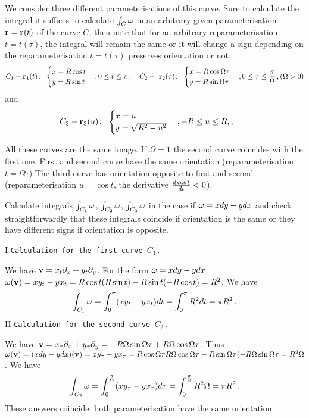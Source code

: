 \documentclass[12pt]{article}
\numberwithin{equation}{section}
\begin{document}
We  consider three different parameterisations of this curve.
Sure to calculate the integral it suffices to calculate 
$\int_C {\omega}$ in an arbitrary given parameterisation ${\bf r}={\bf r}(t)$ 
of the curve $C$,
then note that for an arbitrary reparameterisation
$t=t(\tau)$, the integral will remain the same or it 
will change a sign depending on the reparameterisation $t=t(\tau)$ 
preserves  orientation or not. 
           $$
          C_1- {\bf r}_1(t)\colon\,\,
              \begin{cases}
              x=R\cos t\cr
              y=R\sin t\cr
              \end{cases}, 0\leq t\leq \pi\,,
            \quad
                    C_2-
              \,\,{\bf r}_2(\tau)\colon\,\,
              \begin{cases}
              x=R\cos \Omega \tau\cr
              y=R\sin \Omega \tau\cr
              \end{cases},
               0\leq \tau\leq {\pi\over \Omega}\,, (\Omega>0)
              $$
           and
           \begin{equation}\label{diffparamofhalfcircle}
       C_3-  {\bf r}_3(u)\colon\,\,
              \begin{cases}
              x=u\cr
              y=\sqrt {R^2-u^2}\cr
              \end{cases}, -R\leq u\leq R,,\qquad
               \end{equation}

All these curves are the same image. If $\Omega=1$ 
the second curve coincides with the first one.
First and second curve have the same orientation 
(reparameterisation $t=\Omega \tau$)
The third curve has orientation opposite to first 
and second (reparameterisation
$u=\cos t$, the derivative ${d\cos t\over dt}<0$).


Calculate integrals $\int_{C_1} {\omega}$, $\int_{C_2} {\omega}$, $\int_{C_3} {\omega}$
in the case if ${\omega}=xdy-ydx$
and check straightforwardly that these integrals coincide
if orientation is the same or they have different signs
if orientation is opposite. 

I {\tt Calculation for the first curve $C_1$.}
 
  We have ${\bf v}=x_t\partial_x+y_t\partial_y$.
 For the form  ${\omega}=xdy-ydx$
  ${\omega}({\bf v})=xy_t-yx_t=R\cos t (R\sin t)-R\sin t(-R\cos t)=R^2$. We have
                $$
 \int_{C_1} {\omega}=\int_0^\pi(xy_t-yx_t)dt=
\int_0^\pi R^2dt=\pi R^2\,.
              $$
II {\tt Calculation for the second curve $C_2$.}
 
  We have ${\bf v}=x_\tau\partial_x+y_\tau\partial_y=-R\Omega \sin\Omega\tau+
R\Omega \cos\Omega\tau$. Thus
  ${\omega}({\bf v})=(xdy-ydx)({\bf v})=xy_\tau-yx_\tau=
R\cos \Omega\tau  R\Omega \cos\Omega\tau-
R\sin \Omega\tau  (-R\Omega \sin\Omega\tau=R^2\Omega$. We have
          $$
 \int_{C_2} {\omega}=\int_0^{\pi\over \Omega}
 (xy_\tau-yx_\tau)d\tau=
\int_0^{\pi\over \Omega}R^2\Omega=\pi R^2\,.
         $$
These answers coincide: both parameterisation have the same orientation.
\end{document}
